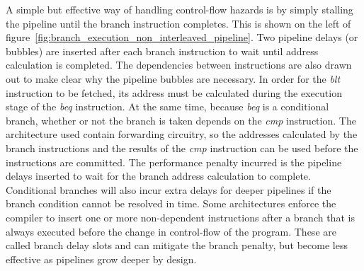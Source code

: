 A simple but effective way of handling control-flow hazards is by simply stalling the pipeline until the branch instruction completes.
This is shown on the left of figure~\ref{fig:branch_execution_non_interleaved_pipeline}. 
Two pipeline delays (or bubbles) are inserted after each branch instruction to wait until address calculation is completed.
The dependencies between instructions are also drawn out to make clear why the pipeline bubbles are necessary.
In order for the \emph{blt} instruction to be fetched, its address must be calculated during the execution stage of the \emph{beq} instruction.
At the same time, because \emph{beq} is a conditional branch, whether or not the branch is taken depends on the \emph{cmp} instruction.
The architecture used contain forwarding circuitry, so the addresses calculated by the branch instructions and the results of the \emph{cmp} instruction can be used before the instructions are committed.
The performance penalty incurred is the pipeline delays inserted to wait for the branch address calculation to complete.
Conditional branches will also incur extra delays for deeper pipelines if the branch condition cannot be resolved in time. 
Some architectures enforce the compiler to insert one or more non-dependent instructions after a branch that is always executed before the change in control-flow of the program. 
These are called branch delay slots and can mitigate the branch penalty, but become less effective as pipelines grow deeper by design. 


